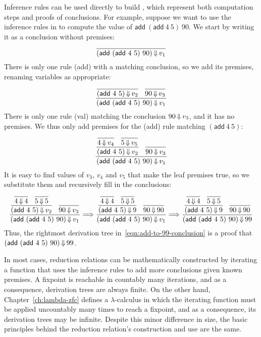 Inference rules can be used directly to build , which represent both computation steps and proofs of conclusions.
For example, suppose we want to use the inference rules in  to compute the value of $\mathsf{add}~(\mathsf{add}~4~5)~90$.
We start by writing it as a conclusion without premises:
\begin{equation}
	\dfrac{}{(\mathsf{add}~(\mathsf{add}~4~5)~90) \operatorname{\Downarrow} v_1}
\label{eqn:add-to-99-start}
\end{equation}
There is only one rule (add) with a matching conclusion, so we add its premises, renaming variables as appropriate:
\begin{equation}
	\dfrac{\dfrac{}{(\mathsf{add}~4~5) \operatorname{\Downarrow} v_2} \;\;\, \dfrac{}{90 \operatorname{\Downarrow} v_3}}{(\mathsf{add}~(\mathsf{add}~4~5)~90) \operatorname{\Downarrow} v_1}
\end{equation}
There is only one rule (val) matching the conclusion $90 \operatorname{\Downarrow} v_3$, and it has no premises.
We thus only add premises for the (add) rule matching $(\mathsf{add}~4~5)$:
\begin{equation}
	\dfrac{\dfrac{\dfrac{}{4 \operatorname{\Downarrow} v_4} \;\;\, \dfrac{}{5 \operatorname{\Downarrow} v_5}}{(\mathsf{add}~4~5) \operatorname{\Downarrow} v_2} \;\;\, \dfrac{}{90 \operatorname{\Downarrow} v_3}}{(\mathsf{add}~(\mathsf{add}~4~5)~90) \operatorname{\Downarrow} v_1}
\end{equation}
It is easy to find values of $v_3$, $v_4$ and $v_5$ that make the leaf premises true, so we substitute them and recursively fill in the conclusions:
\begin{equation}
	\dfrac{\dfrac{\dfrac{}{4 \operatorname{\Downarrow} 4} \;\;\, \dfrac{}{5 \operatorname{\Downarrow} 5}}{(\mathsf{add}~4~5) \operatorname{\Downarrow} v_2} \;\;\, \dfrac{}{90 \operatorname{\Downarrow} v_3}}{(\mathsf{add}~(\mathsf{add}~4~5)~90) \operatorname{\Downarrow} v_1}
	\Longrightarrow
	\dfrac{\dfrac{\dfrac{}{4 \operatorname{\Downarrow} 4} \;\;\, \dfrac{}{5 \operatorname{\Downarrow} 5}}{(\mathsf{add}~4~5) \operatorname{\Downarrow} 9} \;\;\, \dfrac{}{90 \operatorname{\Downarrow} 90}}{(\mathsf{add}~(\mathsf{add}~4~5)~90) \operatorname{\Downarrow} v_1}
	\Longrightarrow
	\dfrac{\dfrac{\dfrac{}{4 \operatorname{\Downarrow} 4} \;\;\, \dfrac{}{5 \operatorname{\Downarrow} 5}}{(\mathsf{add}~4~5) \operatorname{\Downarrow} 9} \;\;\, \dfrac{}{90 \operatorname{\Downarrow} 90}}{(\mathsf{add}~(\mathsf{add}~4~5)~90) \operatorname{\Downarrow} 99}
\label{eqn:add-to-99-conclusion}
\end{equation}
Thus, the rightmost derivation tree in~\eqref{eqn:add-to-99-conclusion} is a proof that $(\mathsf{add}~(\mathsf{add}~4~5)~90) \operatorname{\Downarrow} 99$.

In most cases, reduction relations can be mathematically constructed by iterating a function that uses the inference rules to add more conclusions given known premises.
A fixpoint is reachable in countably many iterations, and as a consequence, derivation trees are always finite.
On the other hand, Chapter~\ref{ch:lambda-zfc} defines a $\lambda$-calculus in which the iterating function must be applied uncountably many times to reach a fixpoint, and as a consequence, its derivation trees may be infinite.
Despite this minor difference in size, the basic principles behind the reduction relation's construction and use are the same.

